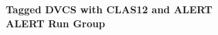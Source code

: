 \begin{titlepage}
     \begin{center}
       \vspace*{-1.5cm}
        \\
       \vspace*{0.2cm}
        \\
       \vspace*{2.3cm}
       \noindent \Huge \textbf{Tagged DVCS with CLAS12 and ALERT} \\
       \vspace*{0.6cm}
       \noindent \Large \textbf{ALERT Run Group} \\
       \vspace*{0.7cm}
     \end{center}
   

\end{titlepage}
